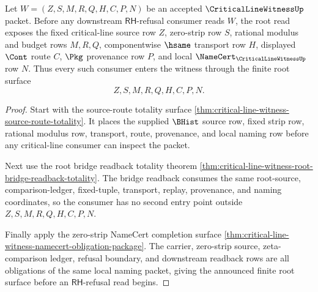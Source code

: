 \begin{theorem}
\label{thm:critical-line-witness-modulus-strip-source-totality}
Let $W=(Z,S,M,R,Q,H,C,P,N)$ be an accepted $\CriticalLineWitnessUp$ packet.
Before any downstream $\mathsf{RH}$-refusal consumer reads $W$, the root read
exposes the fixed critical-line source row $Z$, zero-strip row $S$, rational
modulus and budget rows $M,R,Q$, componentwise $\hsame$ transport row $H$,
displayed $\Cont$ route $C$, $\Pkg$ provenance row $P$, and local
$\NameCert_{\CriticalLineWitnessUp}$ row $N$. Thus every such consumer enters
the witness through the finite root surface
$$
Z,S,M,R,Q,H,C,P,N.
$$
\end{theorem}
\begin{proof}
Start with the source-route totality surface
\autoref{thm:critical-line-witness-source-route-totality}. It places the
supplied $\BHist$ source row, fixed strip row, rational modulus row, transport,
route, provenance, and local naming row before any critical-line consumer can
inspect the packet.

Next use the root bridge readback totality theorem
\autoref{thm:critical-line-witness-root-bridge-readback-totality}. The bridge
readback consumes the same root-source, comparison-ledger, fixed-tuple,
transport, replay, provenance, and naming coordinates, so the consumer has no
second entry point outside $Z,S,M,R,Q,H,C,P,N$.

Finally apply the zero-strip NameCert completion surface
\autoref{thm:critical-line-witness-namecert-obligation-package}. The carrier,
zero-strip source, zeta-comparison ledger, refusal boundary, and downstream
readback rows are all obligations of the same local naming packet, giving the
announced finite root surface before an $\mathsf{RH}$-refusal read begins.
\end{proof}


